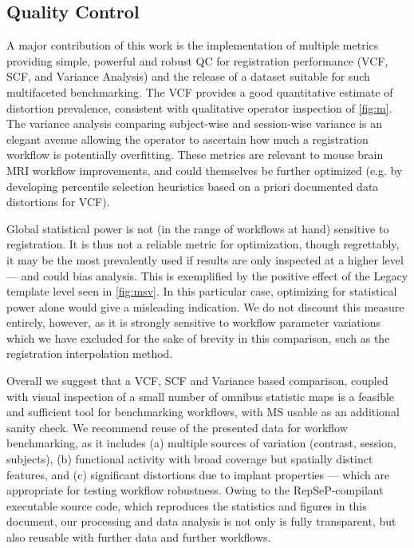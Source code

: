 \subsection{Quality Control}

A major contribution of this work is the implementation of multiple metrics providing simple, powerful and robust QC for registration performance (VCF, SCF, and Variance Analysis) and the release of a dataset suitable for such multifaceted benchmarking.
The VCF provides a good quantitative estimate of distortion prevalence, consistent with qualitative operator inspection of \cref{fig:m}.
The variance analysis comparing subject-wise and session-wise variance is an elegant avenue allowing the operator to ascertain how much a registration workflow is potentially overfitting.
These metrics are relevant to mouse brain MRI workflow improvements, and could themselves be further optimized (e.g. by developing percentile selection heuristics based on a priori documented data distortions for VCF).

Global statistical power is not (in the range of workflows at hand) sensitive to registration.
It is thus not a reliable metric for optimization, though regrettably, it may be the most prevalently used if results are only inspected at a higher level --- and could bias analysis.
This is exemplified by the positive effect of the Legacy template level seen in \cref{fig:msv}.
In this particular case, optimizing for statistical power alone would give a misleading indication.
We do not discount this measure entirely, however, as it is strongly sensitive to workflow parameter variations which we have excluded for the sake of brevity in this comparison, such as the registration interpolation method.

Overall we suggest that a VCF, SCF and Variance based comparison, coupled with visual inspection of a small number of omnibus statistic maps is a feasible and sufficient tool for benchmarking workflows, with MS usable as an additional sanity check.
We recommend reuse of the presented data for workflow benchmarking, as it includes (a) multiple sources of variation (contrast, session, subjects), (b) functional activity with broad coverage but spatially distinct features, and (c) significant distortions due to implant properties --- which are appropriate for testing workflow robustness.
Owing to the RepSeP-compilant executable source code, which reproduces the statistics and figures in this document, our processing and data analysis is not only is fully transparent, but also reusable with further data and further workflows.

